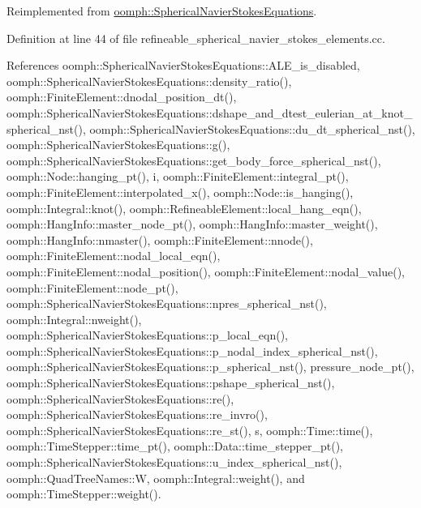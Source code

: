 Reimplemented from \hyperlink{classoomph_1_1SphericalNavierStokesEquations_acd48b82c748de406c94f8d8eabdfa8f5}{oomph\+::\+Spherical\+Navier\+Stokes\+Equations}.



Definition at line 44 of file refineable\+\_\+spherical\+\_\+navier\+\_\+stokes\+\_\+elements.\+cc.



References oomph\+::\+Spherical\+Navier\+Stokes\+Equations\+::\+A\+L\+E\+\_\+is\+\_\+disabled, oomph\+::\+Spherical\+Navier\+Stokes\+Equations\+::density\+\_\+ratio(), oomph\+::\+Finite\+Element\+::dnodal\+\_\+position\+\_\+dt(), oomph\+::\+Spherical\+Navier\+Stokes\+Equations\+::dshape\+\_\+and\+\_\+dtest\+\_\+eulerian\+\_\+at\+\_\+knot\+\_\+spherical\+\_\+nst(), oomph\+::\+Spherical\+Navier\+Stokes\+Equations\+::du\+\_\+dt\+\_\+spherical\+\_\+nst(), oomph\+::\+Spherical\+Navier\+Stokes\+Equations\+::g(), oomph\+::\+Spherical\+Navier\+Stokes\+Equations\+::get\+\_\+body\+\_\+force\+\_\+spherical\+\_\+nst(), oomph\+::\+Node\+::hanging\+\_\+pt(), i, oomph\+::\+Finite\+Element\+::integral\+\_\+pt(), oomph\+::\+Finite\+Element\+::interpolated\+\_\+x(), oomph\+::\+Node\+::is\+\_\+hanging(), oomph\+::\+Integral\+::knot(), oomph\+::\+Refineable\+Element\+::local\+\_\+hang\+\_\+eqn(), oomph\+::\+Hang\+Info\+::master\+\_\+node\+\_\+pt(), oomph\+::\+Hang\+Info\+::master\+\_\+weight(), oomph\+::\+Hang\+Info\+::nmaster(), oomph\+::\+Finite\+Element\+::nnode(), oomph\+::\+Finite\+Element\+::nodal\+\_\+local\+\_\+eqn(), oomph\+::\+Finite\+Element\+::nodal\+\_\+position(), oomph\+::\+Finite\+Element\+::nodal\+\_\+value(), oomph\+::\+Finite\+Element\+::node\+\_\+pt(), oomph\+::\+Spherical\+Navier\+Stokes\+Equations\+::npres\+\_\+spherical\+\_\+nst(), oomph\+::\+Integral\+::nweight(), oomph\+::\+Spherical\+Navier\+Stokes\+Equations\+::p\+\_\+local\+\_\+eqn(), oomph\+::\+Spherical\+Navier\+Stokes\+Equations\+::p\+\_\+nodal\+\_\+index\+\_\+spherical\+\_\+nst(), oomph\+::\+Spherical\+Navier\+Stokes\+Equations\+::p\+\_\+spherical\+\_\+nst(), pressure\+\_\+node\+\_\+pt(), oomph\+::\+Spherical\+Navier\+Stokes\+Equations\+::pshape\+\_\+spherical\+\_\+nst(), oomph\+::\+Spherical\+Navier\+Stokes\+Equations\+::re(), oomph\+::\+Spherical\+Navier\+Stokes\+Equations\+::re\+\_\+invro(), oomph\+::\+Spherical\+Navier\+Stokes\+Equations\+::re\+\_\+st(), s, oomph\+::\+Time\+::time(), oomph\+::\+Time\+Stepper\+::time\+\_\+pt(), oomph\+::\+Data\+::time\+\_\+stepper\+\_\+pt(), oomph\+::\+Spherical\+Navier\+Stokes\+Equations\+::u\+\_\+index\+\_\+spherical\+\_\+nst(), oomph\+::\+Quad\+Tree\+Names\+::W, oomph\+::\+Integral\+::weight(), and oomph\+::\+Time\+Stepper\+::weight().




